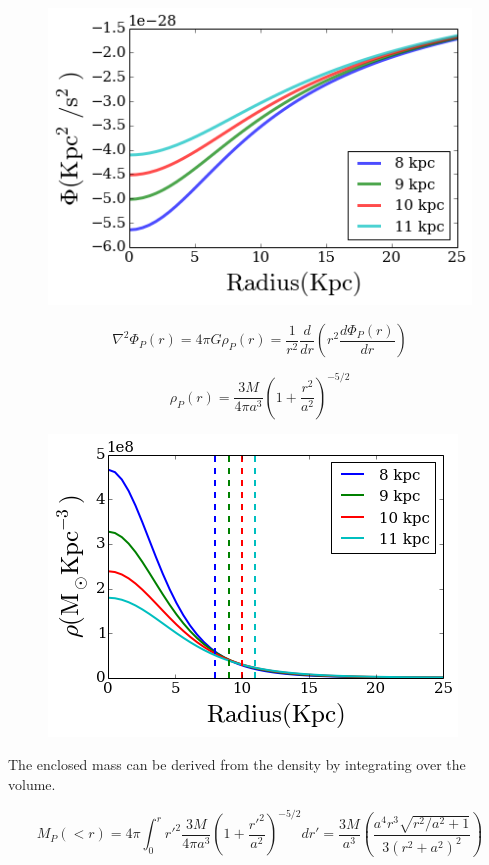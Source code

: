 \documentclass[a4paper, 12pt]{article} %
\begin{document}
\begin{figure}[H]
\centering
\includegraphics[scale=0.5]{plummer_phi.png}
\end{figure}


\begin{equation}
\nabla ^2 \Phi_P(r) = 4 \pi G \rho_P(r) = \frac{1}{r^2}\frac{d}{dr} \left (  r^2 \frac{d\Phi_P(r)}{dr} \right)
\end{equation}

\begin{equation}
\rho_P (r) = \frac{3M}{4\pi a^3} (1 + \frac{r^2}{a^2})^{-5/2}
\end{equation}


\begin{figure}[H]
\centering
\includegraphics[scale=0.5]{plummer_density.png}
\end{figure}



The enclosed mass can be derived from the density by integrating over the volume.

\begin{equation}
M_P(<r) = 4 \pi \int_0^r r'^2\frac{3M}{4\pi a^3} (1 + \frac{r'^2}{a^2})^{-5/2} dr' = \frac{3M}{a^3} \left( \frac{a^4 r^3 \sqrt{r^2/a^2 + 1}}{3(r^2 + a^2)^2}  \right)
\end{equation}
\end{document}
